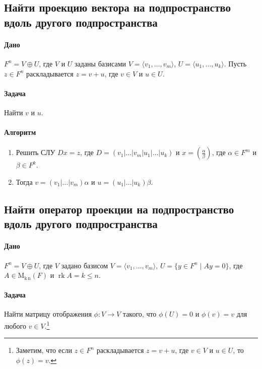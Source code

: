 \documentclass{article}
\newcommand{\MatrixDim}[3]{\operatorname{\mathrm{M}_{#2\,#3}}(#1)}
\newcommand{\rk}{\operatorname{rk}}
\begin{document}
\subsection{Найти проекцию вектора на подпространство вдоль другого подпространства}

\paragraph{Дано} $F^{n} = V \oplus U$, где $V$ и $U$ заданы базисами $V = \langle v_1,\ldots,v_m\rangle$, $U = \langle u_1,\ldots,u_k\rangle$. Пусть $z\in F^{n}$ раскладывается $z = v + u$, где $v\in V$ и $u\in U$.

\paragraph{Задача} Найти $v$ и $u$.

\paragraph{Алгоритм}
\begin{enumerate}
\item Решить СЛУ $D x = z$, где $D = (v_1|\ldots|v_m|u_1|\ldots|u_k)$ и $x = \left(\frac{\alpha}{\beta}\right)$, где $\alpha\in F^{m}$ и $\beta\in F^{k}$.

\item Тогда $v = (v_1|\ldots|v_m)\alpha$ и $u = (u_1|\ldots|u_k)\beta$.
\end{enumerate}

\subsection{Найти оператор проекции на подпространство вдоль другого подпространства}

\paragraph{Дано} $F^{n} = V \oplus U$, где $V$ задано базисом $V = \langle v_1,\ldots,v_m\rangle$, $U = \{y\in F^{n}\mid Ay = 0\}$, где $A\in \MatrixDim{F}{k}{n}$ и $\rk A = k \leqslant n$. 

\paragraph{Задача} Найти матрицу отображения $\phi\colon V\to V$ такого, что $\phi(U) = 0$ и $\phi(v) = v$ для любого $v\in V$.\footnote{Заметим, что если $z\in F^{n}$ раскладывается $z = v + u$, где $v\in V$ и $u\in U$, то $\phi(z) = v$.}
\end{document}
